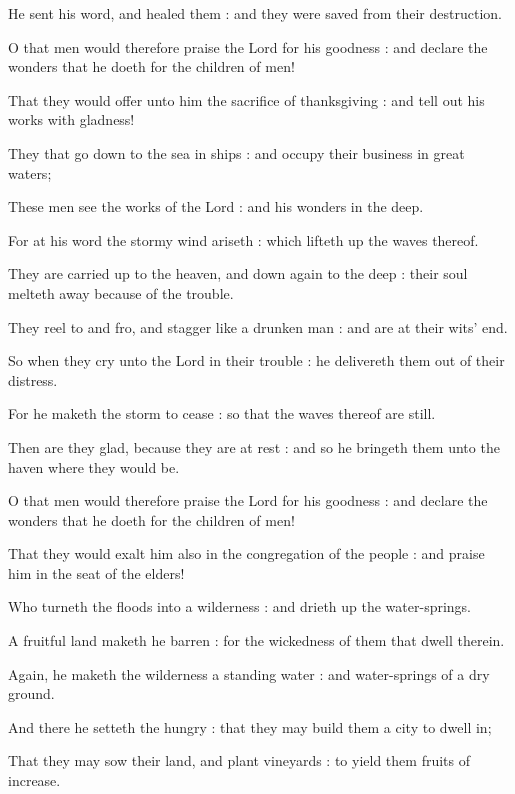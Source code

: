 He sent his word, and healed them : and they were saved from their destruction.\par
{}O that men would therefore praise the Lord for his goodness : and declare the wonders that he doeth for the children of men!\par
{}That they would offer unto him the sacrifice of thanksgiving : and tell out his works with gladness!\par
{}They that go down to the sea in ships : and occupy their business in great waters;\par
{}These men see the works of the Lord : and his wonders in the deep.\par
{}For at his word the stormy wind ariseth : which lifteth up the waves thereof.\par
{}They are carried up to the heaven, and down again to the deep : their soul melteth away because of the trouble.\par
{}They reel to and fro, and stagger like a drunken man : and are at their wits' end.\par
{}So when they cry unto the Lord in their trouble : he delivereth them out of their distress.\par
{}For he maketh the storm to cease : so that the waves thereof are still.\par
{}Then are they glad, because they are at rest : and so he bringeth them unto the haven where they would be.\par
{}O that men would therefore praise the Lord for his goodness : and declare the wonders that he doeth for the children of men!\par
{}That they would exalt him also in the congregation of the people : and praise him in the seat of the elders!\par
{}Who turneth the floods into a wilderness : and drieth up the water-springs.\par
{}A fruitful land maketh he barren : for the wickedness of them that dwell therein.\par
{}Again, he maketh the wilderness a standing water : and water-springs of a dry ground.\par
{}And there he setteth the hungry : that they may build them a city to dwell in;\par
{}That they may sow their land, and plant vineyards : to yield them fruits of increase.\par
